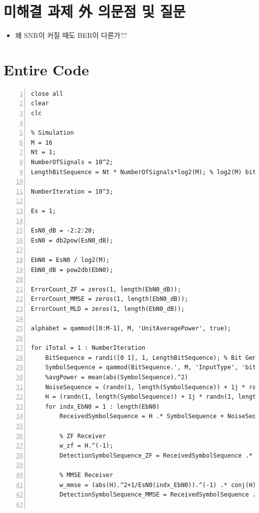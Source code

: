 \documentclass{article}
\begin{document}
\section{미해결 과제 外 의문점 및 질문}
\begin{itemize}
  \item{왜 SNR이 커질 때도 BER이 다른가??}
\end{itemize}
\section{Entire Code}
\begin{lstlisting}[style=Matlab-editor, frame=single, numbers=left,]
close all
clear
clc

% Simulation
M = 16
Nt = 1;
NumberOfSignals = 10^2;
LengthBitSequence = Nt * NumberOfSignals*log2(M); % log2(M) bits per signal

NumberIteration = 10^3;

Es = 1;

EsN0_dB = -2:2:20;
EsN0 = db2pow(EsN0_dB);

EbN0 = EsN0 / log2(M);
EbN0_dB = pow2db(EbN0);

ErrorCount_ZF = zeros(1, length(EbN0_dB));
ErrorCount_MMSE = zeros(1, length(EbN0_dB));
ErrorCount_MLD = zeros(1, length(EbN0_dB));

alphabet = qammod([0:M-1], M, 'UnitAveragePower', true);

for iTotal = 1 : NumberIteration
    BitSequence = randi([0 1], 1, LengthBitSequence); % Bit Generation (BitSequence = rand(1, LengthBitSequence) > 0.5;)
    SymbolSequence = qammod(BitSequence.', M, 'InputType', 'bit', 'UnitAveragePower', 1).';
    %avgPower = mean(abs(SymbolSequence).^2)
    NoiseSequence = (randn(1, length(SymbolSequence)) + 1j * randn(1, length(SymbolSequence))) / sqrt(2); % Noise (n) Generation
    H = (randn(1, length(SymbolSequence)) + 1j * randn(1, length(SymbolSequence))) ./ sqrt(2); % Channel (h) Generation
    for indx_EbN0 = 1 : length(EbN0)
        ReceivedSymbolSequence = H .* SymbolSequence + NoiseSequence * sqrt(1 / EsN0(indx_EbN0)); % Received Signal (y = s + n) Generation

        % ZF Receiver
        w_zf = H.^(-1);
        DetectionSymbolSequence_ZF = ReceivedSymbolSequence .* w_zf; % Detection (Zero-Forcing: y / h)

        % MMSE Receiver
        w_mmse = (abs(H).^2+1/EsN0(indx_EbN0)).^(-1) .* conj(H);
        DetectionSymbolSequence_MMSE = ReceivedSymbolSequence .* w_mmse;;
        

\end{lstlisting}
\end{document}
